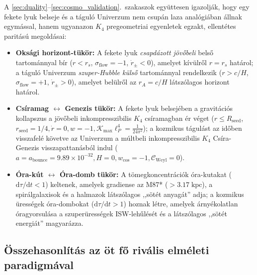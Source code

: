 \documentclass[11pt,a4paper]{article}
\theoremstyle{remark}
\begin{document}
A \ref{sec:duality}--\ref{sec:cosmo_validation}.\ szakaszok egy\"uttesen igazolj\'ak, hogy egy fekete lyuk belseje \'es a t\'agul\'o Univerzum nem csup\'an laza anal\'ogi\'aban \'allnak egym\'assal, hanem ugyanazon $K_4$ pregeometriai egyenletek egzakt, ellent\'etes parit\'as\'u megold\'asai:
\begin{itemize}
  \item \textbf{Oks\'agi horizont-t\"uk\"or:} A fekete lyuk \emph{csapd\'azott j\"ov\H{o}beli} bels\H{o} tartom\'annyal b\'ir ($r < r_s$, $\sigma_{\mathrm{flow}} = -1$, $\dot{r}_\pm < 0$), amelyet k\'iv\"ulr\H{o}l $r = r_s$ hat\'arol; a t\'agul\'o Univerzum \emph{szuper-Hubble k\"uls\H{o}} tartom\'annyal rendelkezik ($r > c/H$, $\sigma_{\mathrm{flow}} = +1$, $\dot{r}_\pm > 0$), amelyet bel\"ulr\H{o}l az $r_A = c/H$ l\'atsz\'olagos horizont hat\'arol.
  \item \textbf{Cs\'iramag $\leftrightarrow$ Genezis t\"uk\"or:} A fekete lyuk belsej\'eben a gravit\'aci\'os kollapszus a j\"ov\H{o}beli inkompresszibilis $K_4$ cs\'iramagban \'er v\'eget ($r \le R_{\mathrm{seed}}$, $r_{\mathrm{seed}} = 1/4, \dot{r} = 0, w = -1, \mathcal{K}_{\max}\ell_P^4 = \frac{1}{24\pi^2}$); a kozmikus t\'agul\'ast az id\H{o}ben visszafel\'e k\"ovetve az Univerzum a m\'ultbeli inkompresszibilis $K_4$ Cs\'ira-Genezis visszapattan\'asb\'ol indul ($a = a_{\mathrm{bounce}} = 9.89 \times 10^{-32}, H = 0, w_{\mathrm{cos}} = -1, \mathcal{C}_{\mathrm{Weyl}} = 0$).
  \item \textbf{\'Ora-k\'ut $\leftrightarrow$ \'Ora-domb t\"uk\"or:} A t\"omegkoncentr\'aci\'ok \'ora-kutakat ($\mathrm{d}\tau/\mathrm{d}t < 1$) keltenek, amelyek gradiense az M87* ($> 3.17\;\mathrm{kpc}$), a spir\'algalaxisok \'es a halmazok l\'atsz\'olagos ,,s\"ot\'et anyag\'at'' adja; a kozmikus \"uress\'egek \'ora-dombokat ($\mathrm{d}\tau/\mathrm{d}t > 1$) hoznak l\'etre, amelyek \'arny\'ekolatlan \'oragyorsul\'asa a szuper\"uress\'egek ISW-leh\H{u}l\'es\'et \'es a l\'atsz\'olagos ,,s\"ot\'et energi\'at'' magyar\'azza.
\end{itemize}

\subsection{\"Osszehasonl\'it\'as az \"ot f\H{o} riv\'alis elm\'eleti paradigm\'aval}
\end{document}
